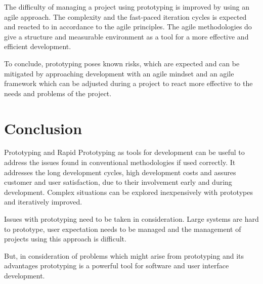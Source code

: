\documentclass[runningheads]{llncs}
\begin{document}
The difficulty of managing a project using prototyping is improved by using an agile approach. The complexity 
and the fast-paced iteration cycles is expected and reacted to in accordance to the agile principles. The
agile methodologies do give a structure and measurable environment as a tool for a more effective and efficient
development.

To conclude, prototyping poses known risks, which are expected and can be mitigated by approaching development
with an agile mindset and an agile framework which can be adjusted during a project to react more effective 
to the needs and problems of the project.

\section{Conclusion}
Prototyping and Rapid Prototyping as tools for development can be useful to address the issues found in conventional methodologies if used correctly. 
It addresses the long development cycles, high development costs and assures customer and user satisfaction, due to their involvement
early and during development. Complex situations can be explored inexpensively with prototypes and iteratively improved.

Issues with prototyping need to be taken in consideration. Large systems are hard to prototype, user expectation needs to be managed and the 
management of projects using this approach is difficult.

But, in consideration of problems which might arise from prototyping and its advantages prototyping is a powerful tool for software and user interface
development.
\end{document}

